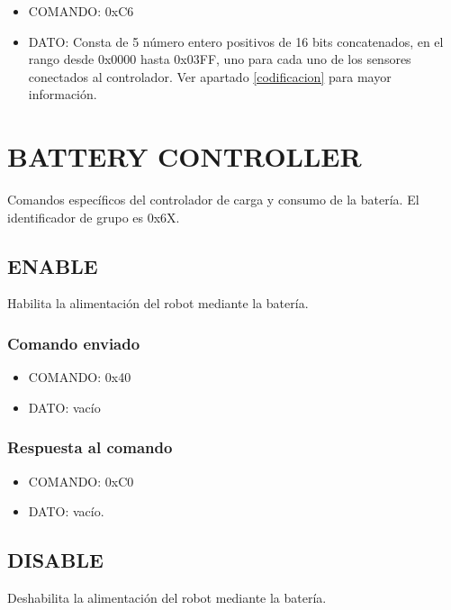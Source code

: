 \documentclass[a4paper,10pt]{article}
\begin{document}
\begin{itemize}
	\item{COMANDO:} 0xC6
	\item{DATO:} Consta de 5 n\'umero entero positivos de 16 bits concatenados, en el rango desde 0x0000 hasta 0x03FF,
		uno para cada uno de los sensores conectados al controlador.
		Ver apartado \ref{codificacion} para mayor informaci\'on.
\end{itemize}

\section{BATTERY CONTROLLER} 
\label{grupo_battery_controller}

Comandos espec\'ificos del controlador de carga y consumo de la bater\'ia.
El identificador de grupo es 0x6X.

\subsection{ENABLE}
\label{get_battery_value}

Habilita la alimentaci\'on del robot mediante la bater\'ia.

\subsubsection*{Comando enviado}

\begin{itemize}
	\item{COMANDO:} 0x40
	\item{DATO:} vac\'io
\end{itemize}

\subsubsection*{Respuesta al comando}

\begin{itemize}
	\item{COMANDO:} 0xC0
	\item{DATO:} vac\'io.

\end{itemize}

\subsection{DISABLE}
\label{get_battery_value}

Deshabilita la alimentaci\'on del robot mediante la bater\'ia.
\end{document}
